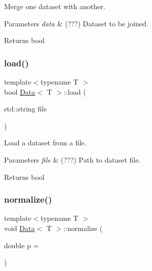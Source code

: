 Merge one dataset with another. 


\begin{DoxyParams}{Parameters}
{\em data} & (???) Dataset to be joined. \\
\hline
\end{DoxyParams}
\begin{DoxyReturn}{Returns}
bool 
\end{DoxyReturn}
\mbox{\label{class_data_a1d15d02eb38c6fb9ebf5d29ecafe7eee}} 
\subsubsection{\texorpdfstring{load()}{load()}}
{\footnotesize\ttfamily template$<$typename T $>$ \\
bool \mbox{\hyperlink{class_data}{Data}}$<$ T $>$\+::load (\begin{DoxyParamCaption}\item[{std\+::string}]{file }\end{DoxyParamCaption})}



Load a dataset from a file. 


\begin{DoxyParams}{Parameters}
{\em file} & (???) Path to dataset file. \\
\hline
\end{DoxyParams}
\begin{DoxyReturn}{Returns}
bool 
\end{DoxyReturn}
\mbox{\label{class_data_a3271dd8204296537222ed74c5aab1a03}} 
\subsubsection{\texorpdfstring{normalize()}{normalize()}\hspace{0.1cm}{\footnotesize\ttfamily [1/2]}}
{\footnotesize\ttfamily template$<$typename T $>$ \\
void \mbox{\hyperlink{class_data}{Data}}$<$ T $>$\+::normalize (\begin{DoxyParamCaption}\item[{double}]{p = {} }\end{DoxyParamCaption})}



